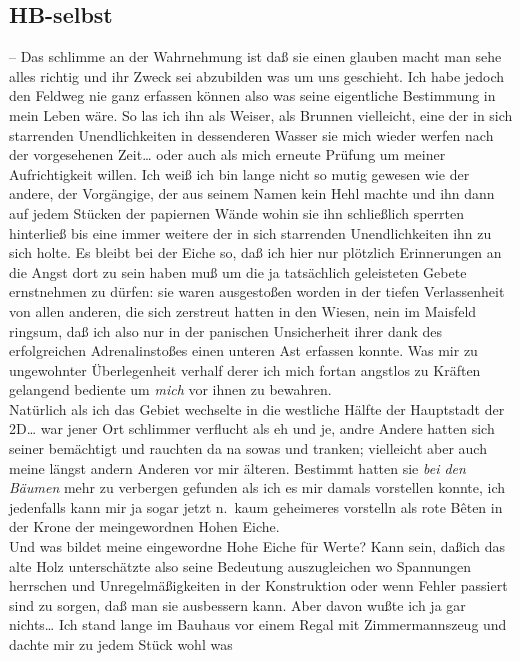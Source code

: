 \documentclass[
]{article}
\author{}
\date{\vspace{-2.5em}}
\begin{document}
\subsection{HB-selbst}\label{hb-selbst}

-- Das schlimme an der Wahrnehmung ist daß sie einen glauben macht man
sehe alles richtig und ihr Zweck sei abzubilden was um uns geschieht.
Ich habe jedoch den Feldweg nie ganz erfassen können also was seine
eigentliche Bestimmung in mein Leben wäre. So las ich ihn als Weiser,
als Brunnen vielleicht, eine der in sich starrenden Unendlichkeiten in
dessenderen Wasser sie mich wieder werfen nach der vorgesehenen
Zeit\ldots{} oder auch als mich erneute Prüfung um meiner Aufrichtigkeit
willen. Ich weiß ich bin lange nicht so mutig gewesen wie der andere,
der Vorgängige, der aus seinem Namen kein Hehl machte und ihn dann auf
jedem Stücken der papiernen Wände wohin sie ihn schließlich sperrten
hinterließ bis eine immer weitere der in sich starrenden Unendlichkeiten
ihn zu sich holte. Es bleibt bei der Eiche so, daß ich hier nur
plötzlich Erinnerungen an die Angst dort zu sein haben muß um die ja
tatsächlich geleisteten Gebete ernstnehmen zu dürfen: sie waren
ausgestoßen worden in der tiefen Verlassenheit von allen anderen, die
sich zerstreut hatten in den Wiesen, nein im Maisfeld ringsum, daß ich
also nur in der panischen Unsicherheit ihrer dank des erfolgreichen
Adrenalinstoßes einen unteren Ast erfassen konnte. Was mir zu
ungewohnter Überlegenheit verhalf derer ich mich fortan angstlos zu
Kräften gelangend bediente um \emph{mich} vor ihnen zu bewahren.\\
Natürlich als ich das Gebiet wechselte in die westliche Hälfte der
Hauptstadt der 2D\ldots{} war jener Ort schlimmer verflucht als eh und
je, andre Andere hatten sich seiner bemächtigt und rauchten da na sowas
und tranken; vielleicht aber auch meine längst andern Anderen vor mir
älteren. Bestimmt hatten sie \emph{bei den Bäumen} mehr zu verbergen
gefunden als ich es mir damals vorstellen konnte, ich jedenfalls kann
mir ja sogar jetzt n.~kaum geheimeres vorstelln als rote Bêten in der
Krone der meingewordnen Hohen Eiche.\\
Und was bildet meine eingewordne Hohe Eiche für Werte? Kann sein, daßich
das alte Holz unterschätzte also seine Bedeutung auszugleichen wo
Spannungen herrschen und Unregelmäßigkeiten in der Konstruktion oder
wenn Fehler passiert sind zu sorgen, daß man sie ausbessern kann. Aber
davon wußte ich ja gar nichts\ldots{} Ich stand lange im Bauhaus vor
einem Regal mit Zimmermannszeug und dachte mir zu jedem Stück wohl was
\end{document}
